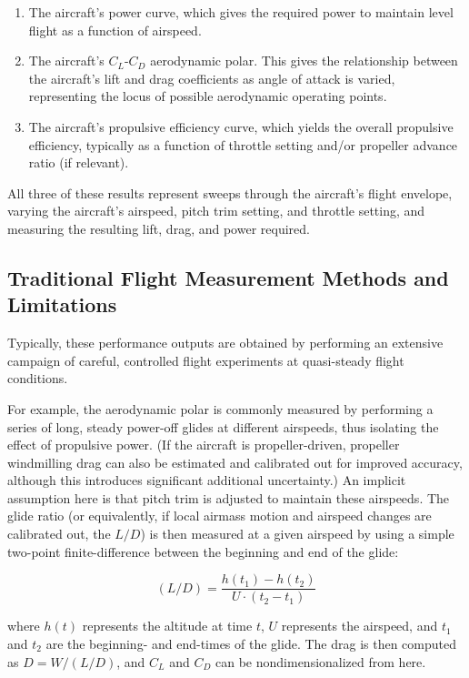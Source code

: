 \begin{enumerate}
    \item The aircraft's power curve, which gives the required power to maintain level flight as a function of airspeed.
    \item The aircraft's $C_L$-$C_D$ aerodynamic polar. This gives the relationship between the aircraft's lift and drag coefficients as angle of attack is varied, representing the locus of possible aerodynamic operating points.
    \item The aircraft's propulsive efficiency curve, which yields the overall propulsive efficiency, typically as a function of throttle setting and/or propeller advance ratio (if relevant).
\end{enumerate}

All three of these results represent sweeps through the aircraft's flight envelope, varying the aircraft's airspeed, pitch trim setting, and throttle setting, and measuring the resulting lift, drag, and power required.

\subsection{Traditional Flight Measurement Methods and Limitations}

Typically, these performance outputs are obtained by performing an extensive campaign of careful, controlled flight experiments at quasi-steady flight conditions.

For example, the aerodynamic polar is commonly measured by performing a series of long, steady power-off glides at different airspeeds, thus isolating the effect of propulsive power. (If the aircraft is propeller-driven, propeller windmilling drag can also be estimated and calibrated out for improved accuracy, although this introduces significant additional uncertainty.) An implicit assumption here is that pitch trim is adjusted to maintain these airspeeds. The glide ratio (or equivalently, if local airmass motion and airspeed changes are calibrated out, the $L/D$) is then measured at a given airspeed by using a simple two-point finite-difference between the beginning and end of the glide:

$$(L/D) = \frac{h(t_1) - h(t_2)}{U \cdot (t_2 - t_1)}$$

where $h(t)$ represents the altitude at time $t$, $U$ represents the airspeed, and $t_1$ and $t_2$ are the beginning- and end-times of the glide. The drag is then computed as $D = W / (L/D)$, and $C_L$ and $C_D$ can be nondimensionalized from here.

